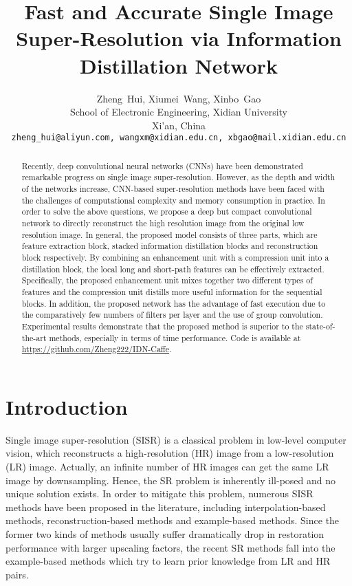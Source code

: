 \documentclass[10pt,twocolumn,letterpaper]{article}
\begin{document}
\title{Fast and Accurate Single Image Super-Resolution via Information Distillation Network}

\author{Zheng~Hui, Xiumei~Wang, Xinbo~Gao\\
School of Electronic Engineering, Xidian University\\
Xi'an, China\\
{\tt\small zheng\_hui@aliyun.com, wangxm@xidian.edu.cn, xbgao@mail.xidian.edu.cn}
}

\maketitle
\thispagestyle{empty}

\begin{abstract}
   Recently, deep convolutional neural networks (CNNs) have been demonstrated remarkable progress on single image super-resolution. However, as the depth and width of the networks increase, CNN-based super-resolution methods have been faced with the challenges of computational complexity and memory consumption in practice. In order to solve the above questions, we propose a deep but compact convolutional network to directly reconstruct the high resolution image from the original low resolution image. In general, the proposed model consists of three parts, which are feature extraction block, stacked information distillation blocks and reconstruction block respectively. By combining an enhancement unit with a compression unit into a distillation block, the local long and short-path features can be effectively extracted. Specifically, the proposed enhancement unit mixes together two different types of features and the compression unit distills more useful information for the sequential blocks. In addition, the proposed network has the advantage of fast execution due to the comparatively few numbers of filters per layer and the use of group convolution. Experimental results demonstrate that the proposed method is superior to the state-of-the-art methods, especially in terms of time performance. Code is available at \url{https://github.com/Zheng222/IDN-Caffe}.
\end{abstract}

\section{Introduction}
Single image super-resolution (SISR) is a classical problem in low-level computer vision, which reconstructs a high-resolution (HR) image from a low-resolution (LR) image. Actually, an infinite number of HR images can get the same LR image by downsampling. Hence, the SR problem is inherently ill-posed and no unique solution exists.  In order to mitigate this problem, numerous SISR methods have been proposed in the literature, including interpolation-based methods, reconstruction-based methods and example-based methods. Since the former two kinds of methods usually suffer dramatically drop in restoration performance with larger upscaling factors, the recent SR methods fall into the example-based methods which try to learn prior knowledge from LR and HR pairs.
\end{document}
